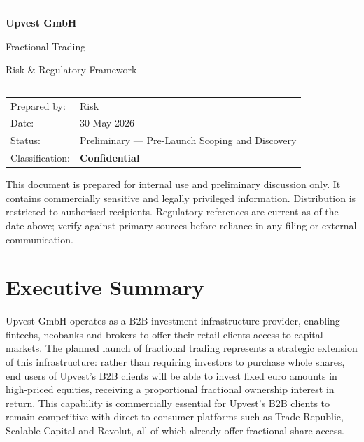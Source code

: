 \documentclass[12pt,a4paper]{report}
\begin{document}
\begin{titlepage}
\centering
\vspace*{1.8cm}
{\color{upvBlue}\rule{\linewidth}{2.5pt}}\vspace{0.6cm}

{\fontsize{36}{42}\selectfont\bfseries\color{upvBlue} Upvest GmbH}

\vspace{0.5cm}
{\fontsize{22}{28}\selectfont\color{upvGray} Fractional Trading}

\vspace{0.25cm}
{\fontsize{16}{20}\selectfont\color{upvGray} Risk \& Regulatory Framework}

\vspace{0.6cm}
{\color{upvBlue}\rule{\linewidth}{2.5pt}}

\vfill

\begin{tabular}{@{}ll@{}}
\textcolor{upvGray}{Prepared by:} & Risk \\[4pt]
\textcolor{upvGray}{Date:}        & 30 May 2026 \\[4pt]
\textcolor{upvGray}{Status:}      & Preliminary --- Pre-Launch Scoping and Discovery \\[4pt]
\textcolor{upvGray}{Classification:} & \textbf{Confidential}
\end{tabular}

\vspace{1.5cm}
\begin{regbox}
This document is prepared for internal use and preliminary discussion only.
It contains commercially sensitive and legally privileged information.
Distribution is restricted to authorised recipients.
Regulatory references are current as of the date above; verify against
primary sources before reliance in any filing or external communication.
\end{regbox}
\end{titlepage}

\tableofcontents
\clearpage

\chapter{Executive Summary}

Upvest GmbH operates as a B2B investment infrastructure provider, enabling fintechs,
neobanks and brokers to offer their retail clients access to capital markets. The planned
launch of fractional trading represents a strategic extension of this infrastructure: rather
than requiring investors to purchase whole shares, end users of Upvest's B2B clients will be
able to invest fixed euro amounts in high-priced equities, receiving a proportional fractional
ownership interest in return. This capability is commercially essential for Upvest's B2B
clients to remain competitive with direct-to-consumer platforms such as Trade Republic,
Scalable Capital and Revolut, all of which already offer fractional share access.
\end{document}
